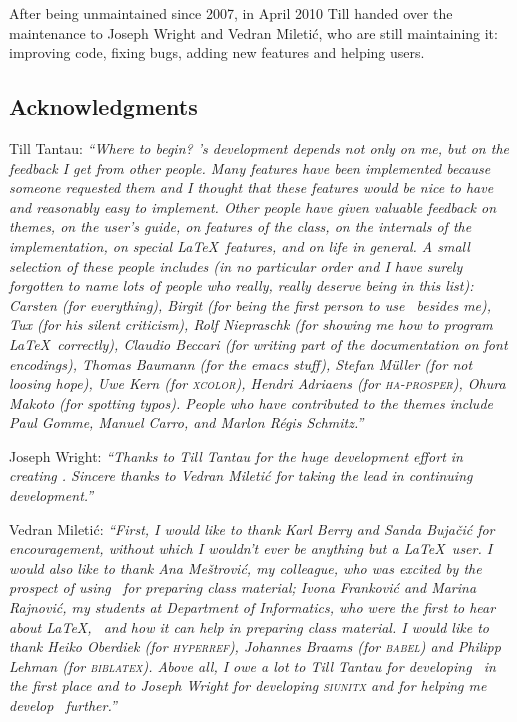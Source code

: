 After being unmaintained since 2007, in April 2010 Till handed over the maintenance to Joseph Wright and Vedran Mileti\'c, who are still maintaining it: improving code, fixing bugs, adding new features and helping users.


\subsection{Acknowledgments}

Till Tantau: \emph{``Where to begin? \beamer's development depends not only on me, but on the feedback I get from other people. Many features have been implemented because someone requested them and I thought that these features would be nice to have and reasonably easy to implement. Other people have given valuable feedback on themes, on the user's guide, on features of the class, on the internals of the implementation, on special \LaTeX\ features, and on life in general. A small selection of these people includes (in no particular order and I have surely forgotten to name lots of people who really, really deserve being in this list): Carsten (for everything), Birgit (for being the first person to use \beamer\ besides me), Tux (for his silent criticism), Rolf Niepraschk (for showing me how to program \LaTeX\ correctly), Claudio Beccari (for writing part of the documentation  on font encodings), Thomas Baumann (for the emacs stuff), Stefan M\"uller (for not loosing hope), Uwe Kern (for \textsc{xcolor}), 
Hendri Adriaens (for \textsc{ha-prosper}), Ohura Makoto (for spotting typos). People who have contributed to the themes include Paul Gomme, Manuel Carro, and Marlon R\'egis Schmitz.''}

Joseph Wright: \emph{``Thanks to Till Tantau for the huge development effort in creating \beamer. Sincere thanks to Vedran Mileti\'c for taking the lead in continuing development.''}

Vedran Mileti\'c: \emph{``First, I would like to thank Karl Berry and Sanda Buja\v ci\'c for encouragement, without which I wouldn't ever be anything but a \LaTeX\ user. I would also like to thank Ana Me\v strovi\'c, my colleague, who was excited by the prospect of using \beamer\ for preparing class material; Ivona Frankovi\'c and Marina Rajnovi\'c, my students at Department of Informatics, who were the first to hear about \LaTeX, \beamer\ and how it can help in preparing class material. I would like to thank Heiko Oberdiek (for \textsc{hyperref}), Johannes Braams (for \textsc{babel}) and Philipp Lehman (for \textsc{biblatex}). Above all, I owe a lot to Till Tantau for developing \beamer\ in the first place and to Joseph Wright for developing \textsc{siunitx} and for helping me develop \beamer\ further.''}


